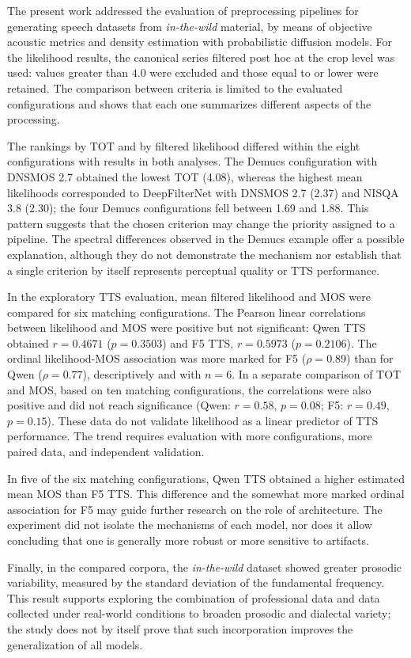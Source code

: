 The present work addressed the evaluation of preprocessing pipelines for generating speech datasets from \textit{in-the-wild} material, by means of objective acoustic metrics and density estimation with probabilistic diffusion models. For the likelihood results, the canonical series filtered post hoc at the crop level was used: values greater than $4.0$ were excluded and those equal to or lower were retained. The comparison between criteria is limited to the evaluated configurations and shows that each one summarizes different aspects of the processing.

The rankings by TOT and by filtered likelihood differed within the eight configurations with results in both analyses. The Demucs configuration with DNSMOS 2.7 obtained the lowest TOT (4.08), whereas the highest mean likelihoods corresponded to DeepFilterNet with DNSMOS 2.7 (2.37) and NISQA 3.8 (2.30); the four Demucs configurations fell between 1.69 and 1.88. This pattern suggests that the chosen criterion may change the priority assigned to a pipeline. The spectral differences observed in the Demucs example offer a possible explanation, although they do not demonstrate the mechanism nor establish that a single criterion by itself represents perceptual quality or TTS performance.

In the exploratory TTS evaluation, mean filtered likelihood and MOS were compared for six matching configurations. The Pearson linear correlations between likelihood and MOS were positive but not significant: Qwen TTS obtained $r = 0.4671$ ($p = 0.3503$) and F5 TTS, $r = 0.5973$ ($p = 0.2106$). The ordinal likelihood-MOS association was more marked for F5 ($\rho = 0.89$) than for Qwen ($\rho = 0.77$), descriptively and with $n=6$. In a separate comparison of TOT and MOS, based on ten matching configurations, the correlations were also positive and did not reach significance (Qwen: $r = 0.58$, $p = 0.08$; F5: $r = 0.49$, $p = 0.15$). These data do not validate likelihood as a linear predictor of TTS performance. The trend requires evaluation with more configurations, more paired data, and independent validation.

In five of the six matching configurations, Qwen TTS obtained a higher estimated mean MOS than F5 TTS. This difference and the somewhat more marked ordinal association for F5 may guide further research on the role of architecture. The experiment did not isolate the mechanisms of each model, nor does it allow concluding that one is generally more robust or more sensitive to artifacts.

Finally, in the compared corpora, the \textit{in-the-wild} dataset showed greater prosodic variability, measured by the standard deviation of the fundamental frequency. This result supports exploring the combination of professional data and data collected under real-world conditions to broaden prosodic and dialectal variety; the study does not by itself prove that such incorporation improves the generalization of all models.
